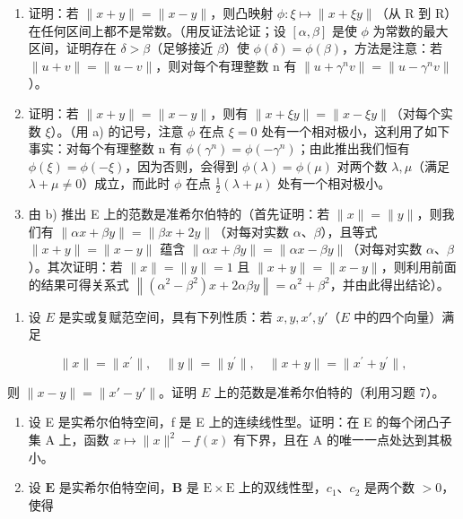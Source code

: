 \begin{enumerate}
\def\labelenumi{\alph{enumi})}
\item
  证明：若 \(\|x+y\|=\|x-y\|\)，则凸映射 \(\phi:\xi\mapsto\|x+\xi y\|\)（从 R 到 R）在任何区间上都不是常数。（用反证法论证；设 \([\alpha,\beta]\) 是使 \(\phi\) 为常数的最大区间，证明存在 \(\delta>\beta\)（足够接近 \(\beta\)）使 \(\phi(\delta)=\phi(\beta)\)，方法是注意：若 \(\|u+v\|=\|u-v\|\)，则对每个有理整数 n 有 \(\|u+\gamma^{n}v\|=\|u-\gamma^{n}v\|\)）。
\item
  证明：若 \(\|x + y\| = \|x - y\|\)，则有 \(\|x + \xi y\| = \|x - \xi y\|\)（对每个实数 \(\xi\)）。（用 a) 的记号，注意 \(\phi\) 在点 \(\xi = 0\) 处有一个相对极小，这利用了如下事实：对每个有理整数 n 有 \(\phi(\gamma^{n}) = \phi(-\gamma^{n})\)；由此推出我们恒有 \(\phi(\xi) = \phi(-\xi)\)，因为否则，会得到 \(\phi(\lambda) = \phi(\mu)\) 对两个数 \(\lambda, \mu\)（满足 \(\lambda + \mu \neq 0\)）成立，而此时 \(\phi\) 在点 \(\frac{1}{2}(\lambda + \mu)\) 处有一个相对极小。
\item
  由 b) 推出 E 上的范数是准希尔伯特的（首先证明：若 \(\|x\| = \|y\|\)，则我们有 \(\|\alpha x + \beta y\| = \|\beta x + 2y\|\)（对每对实数 \(\alpha\)、\(\beta\)），且等式 \(\|x + y\| = \|x - y\|\) 蕴含 \(\|\alpha x + \beta y\| = \|\alpha x - \beta y\|\)（对每对实数 \(\alpha\)、\(\beta\)）。其次证明：若 \(\|x\| = \|y\| = 1\) 且 \(\|x + y\| = \|x - y\|\)，则利用前面的结果可得关系式 \(\left\|\left(\alpha^{2} - \beta^{2}\right)x + 2\alpha\beta y\right\| = \alpha^{2} + \beta^{2}\)，并由此得出结论）。
\end{enumerate}

\begin{enumerate}
\def\labelenumi{\arabic{enumi})}
\setcounter{enumi}{7}
\tightlist
\item
  设 \(E\) 是实或复赋范空间，具有下列性质：若 \(x, y, x', y'\)（\(E\) 中的四个向量）满足
\end{enumerate}

\[
\| x \| = \| x ^ {\prime} \|, \quad \| y \| = \| y ^ {\prime} \|, \quad \| x + y \| = \| x ^ {\prime} + y ^ {\prime} \|,
\]

则 \(\| x - y \| = \| x' - y' \|\)。证明 \(E\) 上的范数是准希尔伯特的（利用习题 7）。

\begin{enumerate}
\def\labelenumi{\arabic{enumi})}
\setcounter{enumi}{8}
\item
  设 E 是实希尔伯特空间，f 是 E 上的连续线性型。证明：在 E 的每个闭凸子集 A 上，函数 \(x \mapsto \|x\|^{2} - f(x)\) 有下界，且在 A 的唯一一点处达到其极小。
\item
  设 \(\mathbf{E}\) 是实希尔伯特空间，\(\mathbf{B}\) 是 \(\mathrm{E} \times \mathrm{E}\) 上的双线性型，\(c_{1}\)、\(c_{2}\) 是两个数 \(> 0\)，使得
\end{enumerate}

